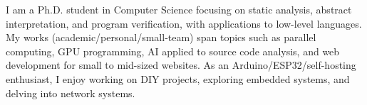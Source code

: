 
\begin{cvparagraph}
    I am a Ph.D. student in Computer Science focusing on static analysis,
    abstract interpretation, and program verification, with applications to
    low-level languages.
    My works (academic/personal/small-team) span topics such as parallel
    computing, GPU programming, AI applied to source code analysis, and web
    development for small to mid-sized websites.
    As an Arduino/ESP32/self-hosting enthusiast, I enjoy working on DIY
    projects, exploring embedded systems, and delving into network systems.
\end{cvparagraph}
